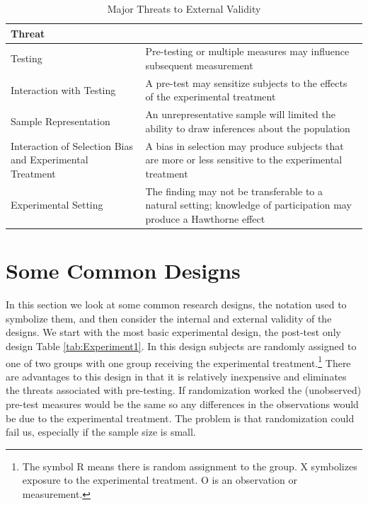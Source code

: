 \documentclass[11pt,openany]{book}\usepackage[]{graphicx}\usepackage[]{color}
\begin{document}
\begin{table}[h]
\caption{Major Threats to External Validity}
\label{tab:ThreatEV}
\begin{tabular}{|p{4cm}|p{9cm}|}
\hline
Threat &  \\ \hline
Testing & Pre-testing or multiple measures may influence subsequent measurement \\ \hline
Interaction with Testing & A pre-test may sensitize subjects to the effects of the experimental treatment \\ \hline
Sample Representation & An unrepresentative sample will limited  the ability to draw inferences about the population \\ \hline
Interaction of Selection Bias and Experimental Treatment & A bias in selection may produce subjects that are more or less sensitive to the experimental treatment \\ \hline
Experimental Setting & The finding may not be transferable to a natural setting; knowledge of participation may produce a Hawthorne effect \\ \hline
\end{tabular}
\end{table}
\FloatBarrier

\section{Some Common Designs}

In this section we look at some common research designs, the notation used to symbolize them, and then consider the internal and external validity of the designs. We start with the most basic experimental design, the post-test only design Table \ref{tab:Experiment1}. In this design subjects are randomly assigned to one of two groups with one group receiving the experimental treatment.\footnote{The symbol R means there is random assignment to the group. X symbolizes exposure to the experimental treatment. O is an observation or measurement.}  There are advantages to this design in that it is relatively inexpensive and eliminates the threats associated with pre-testing. If randomization worked the (unobserved) pre-test measures would be the same so any differences in the observations would be due to the experimental treatment. The problem is that randomization could fail us, especially if the sample size is small.\\
\end{document}
